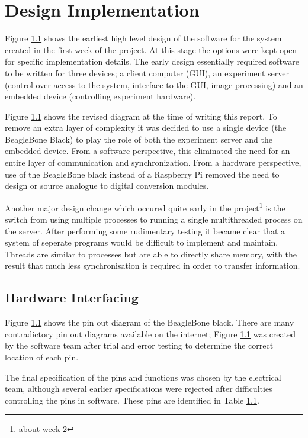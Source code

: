 \chapter{Design Implementation}

Figure \ref{} shows the earliest high level design of the software for the system created in the first week of the project. At this stage the options were kept open for specific implementation details. The early design essentially required software to be written for three devices; a client computer (GUI), an experiment server (control over access to the system, interface to the GUI, image processing) and an embedded device (controlling experiment hardware). 


Figure \ref{} shows the revised diagram at the time of writing this report. To remove an extra layer of complexity it was decided to use a single device (the BeagleBone Black) to play the role of both the experiment server and the embedded device. From a software perspective, this eliminated the need for an entire layer of communication and synchronization. From a hardware perspective, use of the BeagleBone black instead of a Raspberry Pi removed the need to design or source analogue to digital conversion modules.

Another major design change which occured quite early in the project\footnote{about week 2} is the switch from using multiple processes to running a single multithreaded process on the server. After performing some rudimentary testing it became clear that a system of seperate programs would be difficult to implement and maintain. Threads are similar to processes but are able to directly share memory, with the result that much less synchronisation is required in order to transfer information.

\section{Hardware Interfacing}

Figure \ref{} shows the pin out diagram of the BeagleBone black. There are many contradictory pin out diagrams available on the internet; Figure \ref{} was created by the software team after trial and error testing to determine the correct location of each pin.

The final specification of the pins and functions was chosen by the electrical team, although several earlier specifications were rejected  after difficulties controlling the pins in software. These pins are identified in Table \ref{}.



